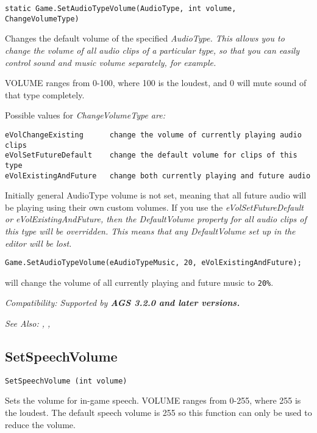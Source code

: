 \begin{verbatim}
static Game.SetAudioTypeVolume(AudioType, int volume, ChangeVolumeType)
\end{verbatim}
Changes the default volume of the specified \it{AudioType}. This allows you to
change the volume of all audio clips of a particular type, so that you can
easily control sound and music volume separately, for example.

VOLUME ranges from 0-100, where 100 is the loudest, and 0 will mute sound of that type completely.

Possible values for \it{ChangeVolumeType} are:
\begin{verbatim}
eVolChangeExisting      change the volume of currently playing audio clips
eVolSetFutureDefault    change the default volume for clips of this type
eVolExistingAndFuture   change both currently playing and future audio
\end{verbatim}

Initially general AudioType volume is not set, meaning that all future audio will be
playing using their own custom volumes.
If you use the \it{eVolSetFutureDefault} or \it{eVolExistingAndFuture}, then
the DefaultVolume property for all audio clips of this type will be overridden.
This means that any DefaultVolume set up in the editor will be lost.

\begin{verbatim}
Game.SetAudioTypeVolume(eAudioTypeMusic, 20, eVolExistingAndFuture);
\end{verbatim}
will change the volume of all currently playing and future music to \verb$20%$.

\it{Compatibility:} Supported by \bf{AGS 3.2.0} and later versions.

\it{See Also:} , ,


\subsection{SetSpeechVolume}\label{SetSpeechVolume}%

\begin{verbatim}
SetSpeechVolume (int volume)
\end{verbatim}
Sets the volume for in-game speech. VOLUME ranges from 0-255, where 255 is
the loudest. The default speech volume is 255 so this function can only
be used to reduce the volume.

